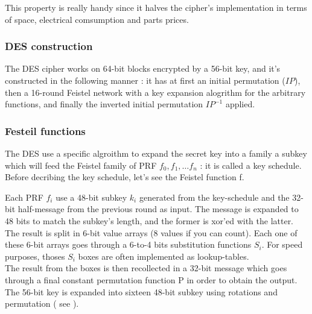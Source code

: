 This property is really handy since it halves the cipher's implementation in terms of space, electrical comsumption and parts prices.

\subsubsection{ DES construction }

The DES cipher works on 64-bit blocks encrypted by a 56-bit key, and it's constructed in the following manner : it has at first an initial permutation ($IP$), then a 16-round Feistel network with a key expansion alogrithm for the arbitrary functions, and finally the inverted initial permutation $IP^{-1}$ applied.

\subsubsection{Festeil functions}

The DES use a specific algroithm to expand the secret key into a family a subkey which will feed the Feistel family of PRF $f_0,f_1,\dots f_n$ : it is called a key schedule. Before decribing the key schedule, let's see the Feistel function f. 

Each PRF $f_i$ use a 48-bit subkey $k_i$ generated from the key-schedule and the 32-bit half-message from the previous round as input. The message is expanded to 48 bits to match the subkey's length, and the former is xor'ed with the latter.\\
The result is split in 6-bit value arrays (8 values if you can count). Each one of these 6-bit arrays goes through a 6-to-4 bits substitution functions $S_i$. For speed purposes, thoses $S_i$ boxes are often implemented as lookup-tables. \\
The result from the boxes is then recollected in a 32-bit message which goes through a final constant permutation function P in order to obtain the output. \\

The 56-bit key is expanded into sixteen 48-bit subkey using rotations and permutation ( see \cite{DES-wikipedia} ).

